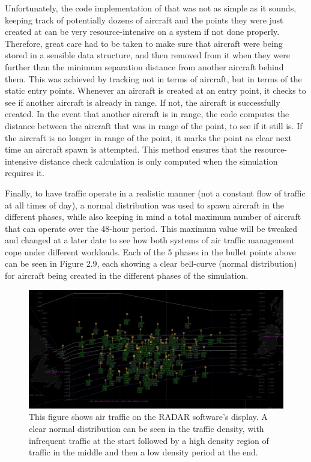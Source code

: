 \documentclass[stu, a4paper, 12pt, floatsintext]{apa7}
\numberwithin{figure}{section}
\numberwithin{table}{section}
\numberwithin{equation}{section}
\begin{document}
Unfortunately, the code implementation of that was not as simple as it sounds, keeping track of potentially dozens of aircraft and the points they were just created at can be very resource-intensive on a system if not done properly. Therefore, great care had to be taken to make sure that aircraft were being stored in a sensible data structure, and then removed from it when they were further than the minimum separation distance from another aircraft behind them. This was achieved by tracking not in terms of aircraft, but in terms of the static entry points. Whenever an aircraft is created at an entry point, it checks to see if another aircraft is already in range. If not, the aircraft is successfully created. In the event that another aircraft is in range, the code computes the distance between the aircraft that was in range of the point, to see if it still is. If the aircraft is no longer in range of the point, it marks the point as clear next time an aircraft spawn is attempted. This method ensures that the resource-intensive distance check calculation is only computed when the simulation requires it.

Finally, to have traffic operate in a realistic manner (not a constant flow of traffic at all times of day), a normal distribution was used to spawn aircraft in the different phases, while also keeping in mind a total maximum number of aircraft that can operate over the 48-hour period. This maximum value will be tweaked and changed at a later date to see how both systems of air traffic management cope under different workloads. Each of the 5 phases in the bullet points above can be seen in Figure 2.9, each showing a clear bell-curve (normal distribution) for aircraft being created in the different phases of the simulation.      

\begin{figure}[H]
    \caption{This figure shows air traffic on the RADAR software's display. A clear normal distribution can be seen in the traffic density, with infrequent traffic at the start followed by a high density region of traffic in the middle and then a low density period at the end.}
    \label{fig:2.9}
    \centering
    \includegraphics[width=1.1\textwidth]{pictures/Figure 2.9 FYP.jpg}    
\end{figure}
\end{document}
